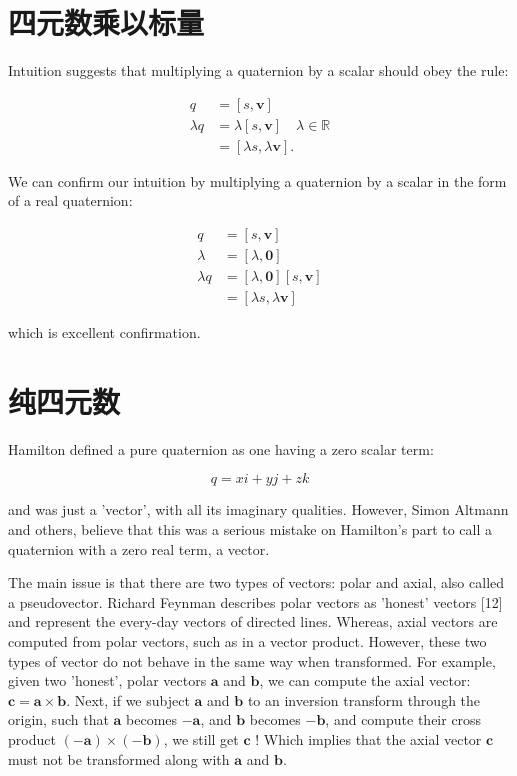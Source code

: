 \section{四元数乘以标量}
Intuition suggests that multiplying a quaternion by a scalar should obey the rule:

$$
\begin{aligned}
q & =[s, \mathbf{v}] \\
\lambda q & =\lambda[s, \mathbf{v}] \quad \lambda \in \mathbb{R} \\
& =[\lambda s, \lambda \mathbf{v}] .
\end{aligned}
$$

We can confirm our intuition by multiplying a quaternion by a scalar in the form of a real quaternion:

$$
\begin{aligned}
q & =[s, \mathbf{v}] \\
\lambda & =[\lambda, \mathbf{0}] \\
\lambda q & =[\lambda, \mathbf{0}][s, \mathbf{v}] \\
& =[\lambda s, \lambda \mathbf{v}]
\end{aligned}
$$

which is excellent confirmation.

\section{纯四元数}
Hamilton defined a pure quaternion as one having a zero scalar term:

$$
q=x i+y j+z k
$$

and was just a 'vector', with all its imaginary qualities. However, Simon Altmann and others, believe that this was a serious mistake on Hamilton's part to call a quaternion with a zero real term, a vector.

The main issue is that there are two types of vectors: polar and axial, also called a pseudovector. Richard Feynman describes polar vectors as 'honest' vectors [12] and represent the every-day vectors of directed lines. Whereas, axial vectors are computed from polar vectors, such as in a vector product. However, these two types of vector do not behave in the same way when transformed. For example, given two 'honest', polar vectors $\mathbf{a}$ and $\mathbf{b}$, we can compute the axial vector: $\mathbf{c}=\mathbf{a} \times \mathbf{b}$. Next, if we subject $\mathbf{a}$ and $\mathbf{b}$ to an inversion transform through the origin, such that $\mathbf{a}$ becomes $-\mathbf{a}$, and $\mathbf{b}$ becomes $-\mathbf{b}$, and compute their cross product $(-\mathbf{a}) \times(-\mathbf{b})$, we still get $\mathbf{c}$ ! Which implies that the axial vector $\mathbf{c}$ must not be transformed along with $\mathbf{a}$ and $\mathbf{b}$.

